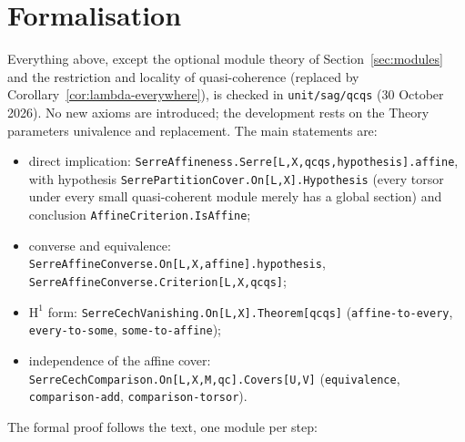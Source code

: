 \documentclass[11pt]{amsart}
\theoremstyle{definition}\newtheorem{definition}[theorem]{Definition}
\theoremstyle{remark}\newtheorem{remark}[theorem]{Remark}
\newcommand{\HH}{\mathrm H}
\newcommand{\code}[1]{{\small\texttt{#1}}}
\begin{document}
\section{Formalisation}\label{sec:review}
\sloppy
Everything above, except the optional module theory of
Section~\ref{sec:modules} and the restriction and locality of
quasi-coherence (replaced by Corollary~\ref{cor:lambda-everywhere}), is
checked in \code{unit/sag/qcqs} (30 October 2026). No new axioms are
introduced; the development rests on the Theory parameters univalence
and replacement. The main statements are:
\begin{itemize}
\item direct implication: \code{SerreAffineness.Serre[L,X,qcqs,hypothesis].affine},
 with hypothesis \code{SerrePartitionCover.On[L,X].Hypothesis} (every
 torsor under every small quasi-coherent module merely has a global
 section) and conclusion \code{AffineCriterion.IsAffine};
\item converse and equivalence: \code{SerreAffineConverse.On[L,X,affine].hypothesis},
 \code{SerreAffineConverse.Criterion[L,X,qcqs]};
\item $\HH^1$ form: \code{SerreCechVanishing.On[L,X].Theorem[qcqs]}
 (\code{affine-to-every}, \code{every-to-some}, \code{some-to-affine});
\item independence of the affine cover:
 \code{SerreCechComparison.On[L,X,M,qc].Covers[U,V]}
 (\code{equivalence}, \code{comparison-add}, \code{comparison-torsor}).
\end{itemize}
The formal proof follows the text, one module per step:
\end{document}
